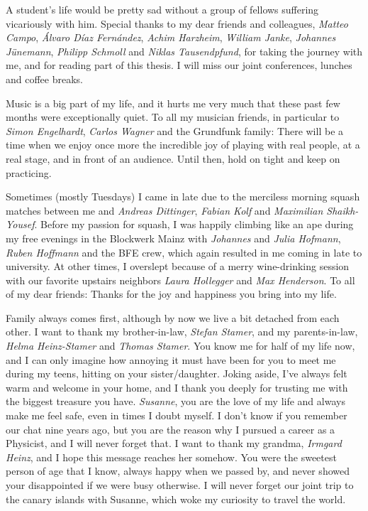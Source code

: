 A student's life would be pretty sad without a group of fellows suffering vicariously with him.
Special thanks to my dear friends and colleagues, {\it Matteo Campo}, {\it Álvaro Díaz Fernández}, {\it Achim Harzheim}, {\it William Janke}, {\it Johannes Jünemann}, {\it Philipp Schmoll} and {\it Niklas Tausendpfund}, for taking the journey with me, and for reading part of this thesis.
I will miss our joint conferences, lunches and coffee breaks.

Music is a big part of my life, and it hurts me very much that these past few months were exceptionally quiet.
To all my musician friends, in particular to {\it Simon Engelhardt}, {\it Carlos Wagner} and the Grundfunk family:
There will be a time when we enjoy once more the incredible joy of playing with real people, at a real stage, and in front of an audience.
Until then, hold on tight and keep on practicing.

Sometimes (mostly Tuesdays) I came in late due to the merciless morning squash matches between me and {\it Andreas Dittinger}, {\it Fabian Kolf} and {\it Maximilian Shaikh-Yousef}.
Before my passion for squash, I was happily climbing like an ape during my free evenings in the Blockwerk Mainz with {\it Johannes} and {\it Julia Hofmann}, {\it Ruben Hoffmann} and the BFE crew, which again resulted in me coming in late to university.
At other times, I overslept because of a merry wine-drinking session with our favorite upstairs neighbors {\it Laura Hollegger} and {\it Max Henderson}.
To all of my dear friends: Thanks for the joy and happiness you bring into my life.

Family always comes first, although by now we live a bit detached from each other.
I want to thank my brother-in-law, {\it Stefan Stamer}, and my parents-in-law, {\it Helma Heinz-Stamer} and {\it Thomas Stamer}.
You know me for half of my life now, and I can only imagine how annoying it must have been for you to meet me during my teens, hitting on your sister/daughter.
Joking aside, I've always felt warm and welcome in your home, and I thank you deeply for trusting me with the biggest treasure you have.
{\it Susanne}, you are the love of my life and always make me feel safe, even in times I doubt myself.
I don't know if you remember our chat nine years ago, but you are the reason why I pursued a career as a Physicist, and I will never forget that.
I want to thank my grandma, {\it Irmgard Heinz}, and I hope this message reaches her somehow.
You were the sweetest person of age that I know, always happy when we passed by, and never showed your disappointed if we were busy otherwise.
I will never forget our joint trip to the canary islands with Susanne, which woke my curiosity to travel the world.

